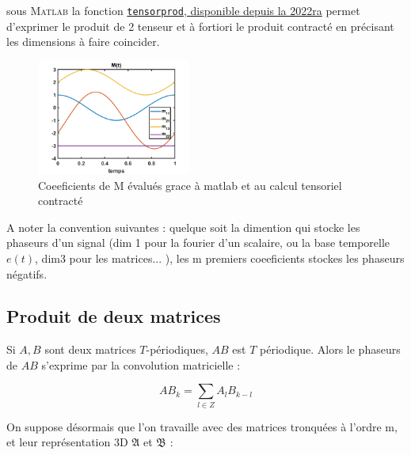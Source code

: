 \documentclass[journal,onecolumn]{IEEEtran}
\begin{document}
sous \textsc{Matlab} la fonction \href{ https://fr.mathworks.com/help/matlab/ref/tensorprod.html }{\texttt{tensorprod}, disponible depuis la 2022ra} permet d'exprimer le produit de 2 tenseur et à fortiori le produit contracté en précisant les dimensions à faire coincider. 


\begin{figure}[h!]
\centering
\includegraphics[width=0.45\textwidth]{doc_LateX/demoMt.png}
\caption{Coeeficients de M évalués grace à matlab et au calcul tensoriel contracté}
\end{figure}

A noter la convention suivantes : quelque soit la dimention qui stocke les phaseurs d'un signal (dim 1 pour la fourier d'un scalaire, ou la base temporelle $e(t)$, dim3 pour les matrices... ), les m premiers coeeficients stockes les phaseurs négatifs. 

\subsection{Produit de deux matrices}


Si $A,B$ sont deux matrices $T$-périodiques, $AB$ est $T$ périodique. Alors le phaseurs de $AB$ s'exprime par la convolution matricielle : 

\begin{equation}
AB_{k} = \sum_{l\in Z} A_{l} B_{k-l} 
\end{equation}

On suppose désormais que l'on travaille avec des matrices tronquées à l'ordre m, et leur représentation 3D $\mathfrak{A}$ et $\mathfrak{B}$ : 
\end{document}
